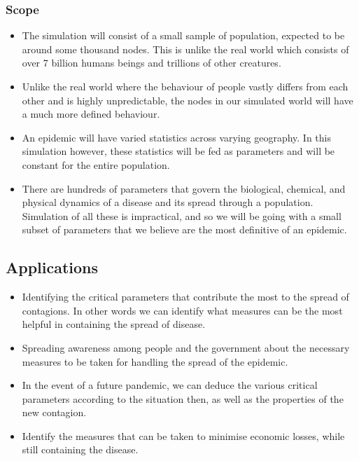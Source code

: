 \documentclass[12pt, a4paper]{extarticle}
\begin{document}
            \subsubsection{Scope}
                \begin{itemize}
                    \item The simulation will consist of a small sample of population, expected to be around some thousand nodes. This is unlike the real world which consists of over 7 billion humans beings and trillions of other creatures.
                    \item Unlike the real world where the behaviour of people vastly differs from each other and is highly unpredictable, the nodes in our simulated world will have a much more defined behaviour.
                    \item An epidemic will have varied statistics across varying geography. In this simulation however, these statistics will be fed as parameters and will be constant for the entire population.
                    \item There are hundreds of parameters that govern the biological, chemical, and physical dynamics of a disease and its spread through a population. Simulation of all these is impractical, and so we will be going with a small subset of parameters that we believe are the most definitive of an epidemic.
                \end{itemize}
        \subsection{Applications}
            \begin{itemize}
                \item Identifying the critical parameters that contribute the most to the spread of contagions. In other words we can identify what measures can be the most helpful in containing the spread of disease.
                \item Spreading awareness among people and the government about the necessary measures to be taken for handling the spread of the epidemic.
                \item In the event of a future pandemic, we can deduce the various critical parameters according to the situation then, as well as the properties of the new contagion.
                \item Identify the measures that can be taken to minimise economic losses, while still containing the disease.
            \end{itemize}
\end{document}
